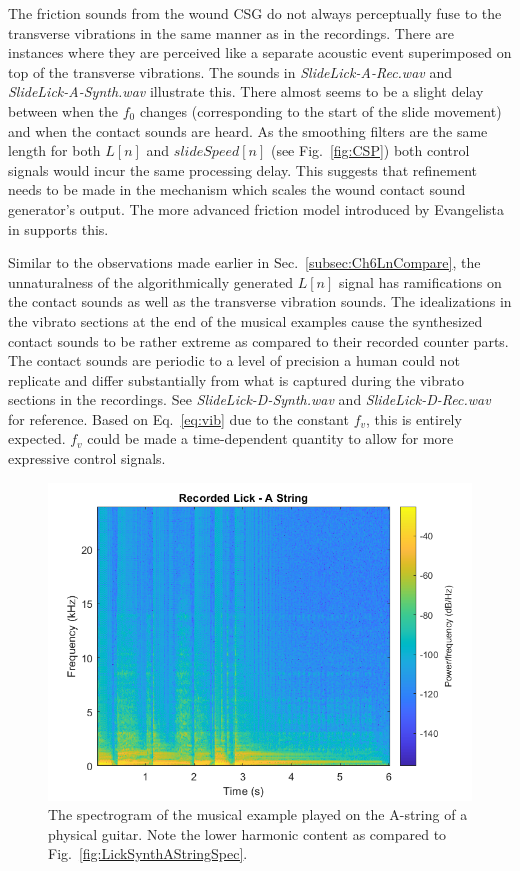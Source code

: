\documentclass[../main.tex]{subfiles}
\begin{document}
The friction sounds from the wound CSG do not always perceptually fuse to the transverse vibrations in the same manner as in the recordings. There are instances where they are perceived like a separate acoustic event superimposed on top of the transverse vibrations. The sounds in \emph{SlideLick-A-Rec.wav} and \emph{SlideLick-A-Synth.wav} illustrate this. There almost seems to be a slight delay between when the $f_0$ changes (corresponding to the start of the  slide movement) and when the contact sounds are heard. As the smoothing filters are the same length for both $L[n]$ and $slideSpeed[n]$ (see Fig.~\ref{fig:CSP}) both control signals would incur the same processing delay. This suggests that refinement needs to be made in the mechanism which scales the wound contact sound generator's output. The more advanced friction model introduced by Evangelista in  supports this.

Similar to the observations made earlier in Sec.~\ref{subsec:Ch6LnCompare}, the unnaturalness of the algorithmically generated $L[n]$ signal has ramifications on the contact sounds as well as the transverse vibration sounds. The idealizations in the vibrato sections at the end of the musical examples cause the synthesized contact sounds to be rather extreme as compared to their recorded counter parts. The contact sounds are periodic to a level of precision a human could not replicate and differ substantially from what is captured during the vibrato sections in the recordings. See \emph{SlideLick-D-Synth.wav} and \emph{SlideLick-D-Rec.wav} for reference. Based on Eq.~\ref{eq:vib} due to the constant $f_v$, this is entirely expected. $f_v$ could be made a time-dependent quantity to allow for more expressive control signals.

\begin{figure}[h]
    \centering
    \includegraphics[scale=.65]{./images/plots/LickRecAString.png}
    \caption{The spectrogram of the musical example played on the A-string of a physical guitar. Note the lower harmonic content as compared to Fig.~\ref{fig:LickSynthAStringSpec}.}
    \label{fig:LickRecAStringSpec}
\end{figure}
\end{document}

